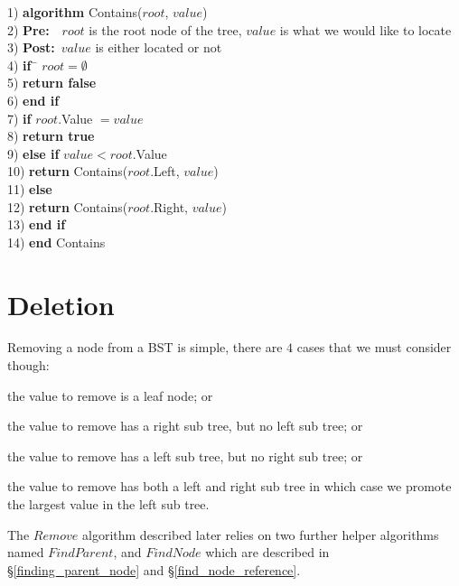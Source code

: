 \begin{tabbing}
1)  \textbf{alg}\= \textbf{orithm} Contains($root$, $value$) \\
2)  \> \textbf{Pre:}~~$root$ is the root node of the tree, $value$ is what we would like to locate \\
3)  \> \textbf{Post:}~$value$ is either located or not \\
4)  \> \textbf{if}~\= $root = \emptyset$ \\
5)  \> \> \textbf{return false} \\
6)  \> \textbf{end if} \\
7)  \> \textbf{if} $root$.Value $= value$ \\
8)  \> \> \textbf{return true} \\
9)  \> \textbf{else if} $value < root$.Value \\
10) \> \> \textbf{return} Contains($root$.Left, $value$) \\
11) \> \textbf{else} \\
12) \> \> \textbf{return} Contains($root$.Right, $value$) \\
13) \> \textbf{end if} \\
14) \textbf{end} Contains \\
\end{tabbing}

\section{Deletion}
Removing a node from a BST is simple, there are $4$ cases that we must consider though: 
\begin{inparaenum}
\item the value to remove is a leaf node; or
\item the value to remove has a right sub tree, but no left sub tree; or
\item the value to remove has a left sub tree, but no right sub tree; or
\item the value to remove has both a left and right sub tree in which case we promote the largest value in the left sub tree.
\end{inparaenum}
The $Remove$ algorithm described later relies on two further helper algorithms named $FindParent$, and $FindNode$ which are described in \S\ref{finding_parent_node} and \S\ref{find_node_reference}.

